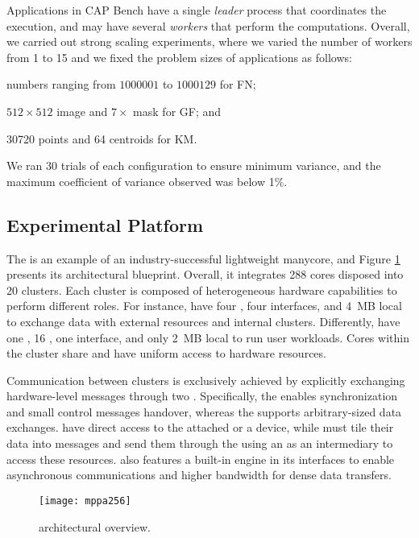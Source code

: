 	Applications in CAP Bench have a single \textit{leader} process that
	coordinates the execution, and may have several \textit{workers}
	that perform the computations.
	Overall, we carried out strong scaling experiments, where we varied
	the number of workers from 1 to 15 and we fixed the problem sizes
	of applications as follows:
	\begin{enumerate*}[label=(\roman*)]
		\item numbers ranging from $1000001$ to $1000129$ for FN;
		\item $512\times512$ image and $7\times$ mask for GF; and
		\item 30720 points and 64 centroids for KM.
	\end{enumerate*}
	We ran 30 trials of each configuration to ensure minimum variance, and
	the maximum coefficient of variance observed was below 1\%.

	\subsection{Experimental Platform}

	The \mppa is an example of an industry-successful lightweight
	manycore, and Figure \ref{figure:lightweight-manycore} presents its
	architectural blueprint.
	Overall, it integrates 288 cores disposed into 20
	clusters. Each cluster is composed of heterogeneous
	hardware capabilities to perform different roles. For instance,
	\ioclusters have four \rmans, four \noc interfaces, and 4~MB local
	\sram to exchange data with external resources and internal clusters.
	Differently, \cclusters have one \rman, 16 \pes, one \noc interface,
	and only 2~MB local \sram to run user workloads. Cores within the
	cluster share and have uniform access to hardware resources.

	Communication between clusters is exclusively achieved by explicitly
	exchanging hardware-level messages through two \nocs. Specifically,
	the \cnoc enables synchronization and small control messages handover,
	whereas the \dnoc supports arbitrary-sized data exchanges.
	\ioclusters have direct access to the attached \dram or a device,
	while \cclusters must tile their data into messages and send them
	through the \noc using an \iocluster as an intermediary to access
	these resources. \mppa also features
	a built-in \dma engine in its \noc interfaces to enable asynchronous
	communications and higher bandwidth for dense data transfers.

	\begin{figure}[t]
		\centering
		\texttt{[image: mppa256]}
		\caption{\mppa architectural overview.}
		\label{figure:lightweight-manycore}
		\vspace{-10pt}
	\end{figure}
